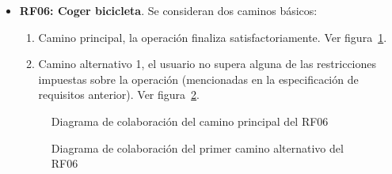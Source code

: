 \begin{itemize}
	\FloatBarrier
	\item \textbf{RF06: Coger bicicleta}. Se consideran dos caminos básicos: 
	\begin{enumerate}
		\item Camino principal, la operación finaliza satisfactoriamente. Ver figura~\ref{fig:diagramaColaboracion_RF06_1}.
		\item Camino alternativo 1, el usuario no supera alguna de las restricciones impuestas sobre la operación (mencionadas en la especificación de requisitos anterior). Ver figura~\ref{fig:diagramaColaboracion_RF06_2}.
	\end{enumerate}
	\begin{figure} [!htb]
		\centering
		\caption{Diagrama de colaboración del camino principal del RF06}
		\label{fig:diagramaColaboracion_RF06_1}
	\end{figure}
	\begin{figure} [!htb]
		\centering
		\caption{Diagrama de colaboración del primer camino alternativo del RF06}
		\label{fig:diagramaColaboracion_RF06_2}
	\end{figure}
	

\end{itemize}
